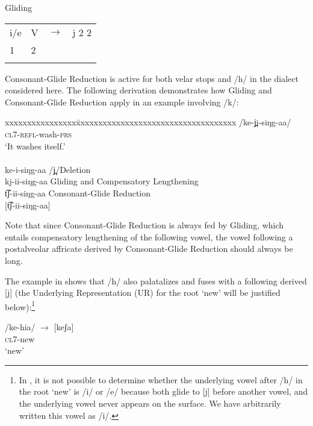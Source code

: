 \documentclass[output=paper]{langsci/langscibook}
\begin{document}
\ea\label{ex:glewwe:8}{}
 Gliding\\{}
 \begin{tabular}{llll}
{i/e} & {V} & $\rightarrow$ & {j 2 2}\\{}
 {1} & {2} & & \\{}
 \end{tabular}
\z

Consonant-Glide Reduction is active for both velar stops and /h/ in the dialect considered here. The following derivation demonstrates how Gliding and Consonant-Glide Reduction apply in an example involving /k/:

\ea\label{ex:glewwe:9}{}
\begin{tabbing}
xxxxxxxxxxxxxxxx\=xxxxxxxxxxxxxxxxxxxxxxxxxxxxxxxxxxxx\kill
/ke-j̪i-siŋg-aa/      \\ 
\textsc{cl7-refl}-wash-\textsc{prs}\\ 
 ‘It washes itself.’ \\
  \\ 
{\dummyslash}ke-i-siŋg-aa   \>     /j̪/Deletion{\footnotemark}\\
{\dummyslash}kj-ii-siŋg-aa  \>  Gliding and Compensatory Lengthening\\
{\dummyslash}t͡ʃ-ii-siŋg-aa  \>  Consonant-Glide Reduction\\
{[t͡ʃ-ii-siŋg-aa]} \>   \\
\end{tabbing}
\z
{} 

Note that since Consonant-Glide Reduction is always fed by Gliding, which entails compensatory lengthening of the following vowel, the vowel following a postalveolar affricate derived by Consonant-Glide Reduction should always be long.

The example in  shows that /h/ also palatalizes and fuses with a following derived [j] (the Underlying Representation (UR) for the root ‘new’ will be justified below):\footnote{In , it is not possible to determine whether the underlying vowel after /h/ in the root ‘new’ is /i/ or /e/ because both glide to [j] before another vowel, and the underlying vowel never appears on the surface. We have arbitrarily written this vowel as /i/.}

\ea\label{ex:glewwe:10}{}
/ke-hia/ $\rightarrow$  [keʃa]{\rmfnm} \\{}
\textsc{cl7}-new\\{}
\glt ‘new’
\z  
{}
\end{document}
